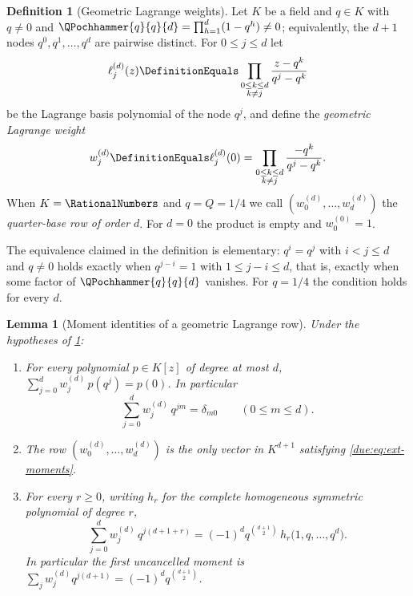 \documentclass[11pt,oneside]{article}
\theoremstyle{plain}
\newtheorem{lemma}[theorem]{Lemma}
\theoremstyle{definition}
\newtheorem{definition}[theorem]{Definition}
\theoremstyle{remark}
\newcommand{\Qq}{Q}                                         %
\newcommand{\Wrow}[2]{w^{(#1)}_{#2}}                        %
\begin{document}
\begin{definition}[Geometric Lagrange weights]
\label{due:def:ext-weights}
Let $K$ be a field and $q\in K$ with $q\neq0$ and
$\QPochhammer{q}{q}{d}=\prod_{h=1}^{d}(1-q^{h})\neq0$; equivalently, the
$d+1$ nodes $q^{0},q^{1},\ldots,q^{d}$ are pairwise distinct.  For
$0\le j\le d$ let
\[
 \ell^{(d)}_{j}(z)
 \DefinitionEquals
 \prod_{\substack{0\le k\le d\\k\neq j}}\frac{z-q^{k}}{q^{j}-q^{k}}
\]
be the Lagrange basis polynomial of the node $q^{j}$, and define the
\emph{geometric Lagrange weight}
\begin{equation}
 \Wrow{d}{j}
 \DefinitionEquals\ell^{(d)}_{j}(0)
 =\prod_{\substack{0\le k\le d\\k\neq j}}\frac{-q^{k}}{q^{j}-q^{k}}.
 \label{due:eq:ext-weight-product}
\end{equation}
When $K=\RationalNumbers$ and $q=\Qq=1/4$ we call
$(\Wrow{d}{0},\ldots,\Wrow{d}{d})$ the \emph{quarter-base row of order $d$}.
For $d=0$ the product is empty and $\Wrow{0}{0}=1$.
\end{definition}

The equivalence claimed in the definition is elementary: $q^{i}=q^{j}$ with
$i<j\le d$ and $q\ne0$ holds exactly when $q^{j-i}=1$ with
$1\le j-i\le d$, that is, exactly when some factor of $\QPochhammer{q}{q}{d}$
vanishes.  For $q=1/4$ the condition holds for every $d$.

\begin{lemma}[Moment identities of a geometric Lagrange row]
\label{due:lem:ext-moments}
Under the hypotheses of \cref{due:def:ext-weights}:
\begin{enumerate}
\item\label{due:it:ext-exact}
 For every polynomial $p\in K[z]$ of degree at most $d$,
 $\sum_{j=0}^{d}\Wrow{d}{j}\,p(q^{j})=p(0)$.  In particular
 \begin{equation}
  \sum_{j=0}^{d}\Wrow{d}{j}\,q^{jm}=\delta_{m0}
  \qquad(0\le m\le d).
  \label{due:eq:ext-moments}
 \end{equation}
\item\label{due:it:ext-unique}
 The row $(\Wrow{d}{0},\ldots,\Wrow{d}{d})$ is the \emph{only} vector in
 $K^{d+1}$ satisfying \cref{due:eq:ext-moments}.
\item\label{due:it:ext-uncancelled}
 For every $r\ge0$, writing $h_{r}$ for the complete homogeneous symmetric
 polynomial of degree $r$,
 \begin{equation}
  \sum_{j=0}^{d}\Wrow{d}{j}\,q^{j(d+1+r)}
  =(-1)^{d}q^{\binom{d+1}{2}}\,h_{r}\bigl(1,q,\ldots,q^{d}\bigr).
  \label{due:eq:ext-uncancelled}
 \end{equation}
 In particular the first uncancelled moment is
 $\sum_{j}\Wrow{d}{j}q^{j(d+1)}=(-1)^{d}q^{\binom{d+1}{2}}$.
\end{enumerate}
\end{lemma}
\end{document}
